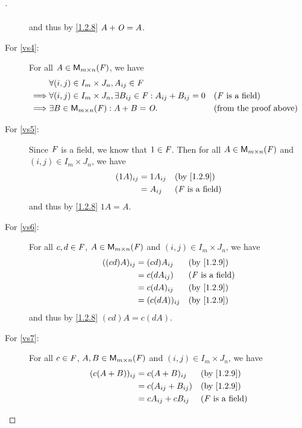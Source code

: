 \begin{proof}[]
\begin{description}
\begin{align*}
			\end{align*}
			and thus by \cref{1.2.8} \(A + \mathit{O} = A\).
		\item[For \ref{vs4}:]
			For all \(A \in \mathsf{M}_{{m} \times n}({\mathit{F}})\), we have
			\begin{align*}
				         & \forall (i, j) \in I_m \times J_n, A_{i j} \in \mathit{F}                                                                    \\
				\implies & \forall (i, j) \in I_m \times J_n, \exists B_{i j} \in \mathit{F} : A_{i j} + B_{i j} = 0 &  & \text{(\(\mathit{F}\) is a field)}    \\
				\implies & \exists B \in \mathsf{M}_{{m} \times n}({\mathit{F}}) : A + B = \mathit{O}.                                                  &  & \text{(from the proof above)}
			\end{align*}
		\item[For \ref{vs5}:]
			Since \(\mathit{F}\) is a field, we know that \(1 \in \mathit{F}\).
			Then for all \(A \in \mathsf{M}_{{m} \times n}({\mathit{F}})\) and \((i, j) \in I_m \times J_n\), we have
			\begin{align*}
				(1A)_{i j} & = 1 A_{i j} &  & \text{(by \cref{1.2.9})}   \\
				           & = A_{i j}   &  & \text{(\(\F\) is a field)}
			\end{align*}
			and thus by \cref{1.2.8} \(1A = A\).
		\item[For \ref{vs6}:]
			For all \(c, d \in \mathit{F}\), \(A \in \mathsf{M}_{{m} \times n}({\mathit{F}})\) and \((i, j) \in I_m \times J_n\), we have
			\begin{align*}
				((cd) A)_{i j} & = (cd) A_{i j}    &  & \text{(by \cref{1.2.9})}   \\
				               & = c (d A_{i j})   &  & \text{(\(\F\) is a field)} \\
				               & = c (d A)_{i j}   &  & \text{(by \cref{1.2.9})}   \\
				               & = (c (d A))_{i j} &  & \text{(by \cref{1.2.9})}
			\end{align*}
			and thus by \cref{1.2.8} \((cd) A = c (dA)\).
		\item[For \ref{vs7}:]
			For all \(c \in \mathit{F}\), \(A, B \in \mathsf{M}_{{m} \times n}({\mathit{F}})\) and \((i, j) \in I_m \times J_n\), we have
			\begin{align*}
				(c (A + B))_{i j} & = c (A + B)_{i j}         &  & \text{(by \cref{1.2.9})}   \\
				                  & = c (A_{i j} + B_{i j})   &  & \text{(by \cref{1.2.9})}   \\
				                  & = c A_{i j} + c B_{i j}   &  & \text{(\(\F\) is a field)} \\

\end{align*}
\end{description}
\end{proof}

